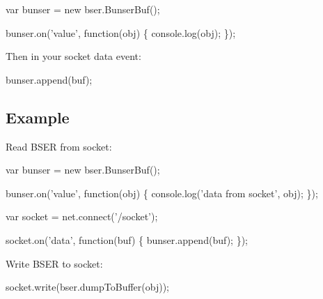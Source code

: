 \begin{DoxyCode}
var bunser = new bser.BunserBuf();

bunser.on('value', function(obj) \{
  console.log(obj);
\});
\end{DoxyCode}


Then in your socket {\ttfamily data} event\+:


\begin{DoxyCode}
bunser.append(buf);
\end{DoxyCode}


\subsection*{Example}

Read B\+S\+ER from socket\+:


\begin{DoxyCode}
var bunser = new bser.BunserBuf();

bunser.on('value', function(obj) \{
  console.log('data from socket', obj);
\});

var socket = net.connect('/socket');

socket.on('data', function(buf) \{
  bunser.append(buf);
\});
\end{DoxyCode}


Write B\+S\+ER to socket\+:


\begin{DoxyCode}
socket.write(bser.dumpToBuffer(obj));
\end{DoxyCode}
 